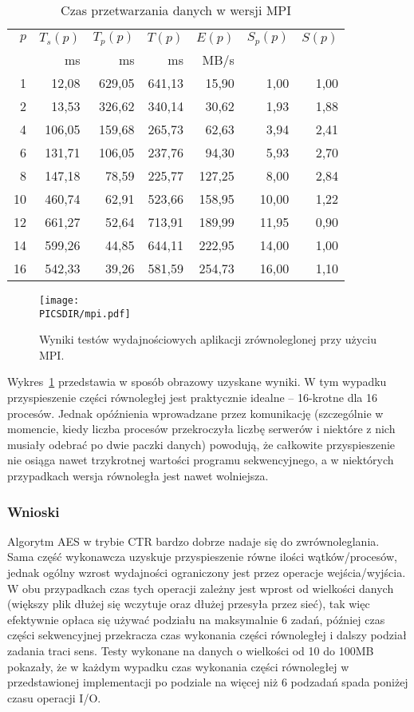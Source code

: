 \documentclass[a4paper,12pt]{article}
\def\PICSDIR{PICS}
\begin{document}
\begin{table}[h!]
\caption{Czas przetwarzania danych w wersji MPI}
\centering
\footnotesize
\begin{tabular}{rrrrrrr}
\toprule
$p$&$T_s(p)$&$T_p(p)$&$T(p)$&$E(p)$&$S_p(p)$&$S(p)$\\
\cmidrule{1-7}
&ms&ms&ms&MB/s&&\\
\midrule
 1 &  12,08 & 629,05 & 641,13 &  15,90 &  1,00 & 1,00 \\
 2 &  13,53 & 326,62 & 340,14 &  30,62 &  1,93 & 1,88 \\
 4 & 106,05 & 159,68 & 265,73 &  62,63 &  3,94 & 2,41 \\
 6 & 131,71 & 106,05 & 237,76 &  94,30 &  5,93 & 2,70 \\
 8 & 147,18 &  78,59 & 225,77 & 127,25 &  8,00 & 2,84 \\
10 & 460,74 &  62,91 & 523,66 & 158,95 & 10,00 & 1,22 \\
12 & 661,27 &  52,64 & 713,91 & 189,99 & 11,95 & 0,90 \\
14 & 599,26 &  44,85 & 644,11 & 222,95 & 14,00 & 1,00 \\
16 & 542,33 &  39,26 & 581,59 & 254,73 & 16,00 & 1,10 \\
\bottomrule
\end{tabular}
\label{tab:mpi}
\end{table}


\begin{figure}[h!]
\centering
\texttt{[image: \\PICSDIR/mpi.pdf]}
\caption{Wyniki testów wydajnościowych aplikacji zrównoleglonej przy użyciu MPI.}
\label{rys:res_mpi}
\end{figure}

Wykres~\ref{rys:res_mpi} przedstawia w sposób obrazowy uzyskane wyniki.
W tym wypadku przyspieszenie części równoległej jest praktycznie idealne -- 16-krotne
dla 16 procesów. Jednak opóźnienia wprowadzane przez komunikację (szczególnie w momencie,
kiedy liczba procesów przekroczyła liczbę serwerów i niektóre z nich musiały odebrać 
po dwie paczki danych) powodują, że całkowite przyspieszenie nie osiąga nawet
trzykrotnej wartości programu sekwencyjnego, a w niektórych przypadkach wersja
równoległa jest nawet wolniejsza.

\subsubsection{Wnioski}
Algorytm AES w trybie CTR bardzo dobrze nadaje się do zwrównoleglania. Sama część
wykonawcza uzyskuje przyspieszenie równe ilości wątków/procesów, jednak ogólny 
wzrost wydajności ograniczony jest przez operacje wejścia/wyjścia. W obu przypadkach 
czas tych operacji zależny jest wprost od wielkości danych (większy plik dłużej się
wczytuje oraz dłużej przesyła przez sieć), tak więc efektywnie opłaca się używać
podziału na maksymalnie 6 zadań, później czas części sekwencyjnej przekracza
czas wykonania części równoległej i dalszy podział zadania traci sens. Testy wykonane
na danych o wielkości od 10 do 100MB pokazały, że w każdym wypadku czas wykonania
części równoległej w  przedstawionej implementacji po podziale na więcej niż 6 podzadań 
spada poniżej czasu operacji I/O.
\end{document}
